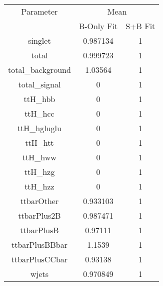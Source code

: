 \begin{table}
\centering

\begin{tabular}{ccc}
\toprule
Parameter 	& \multicolumn{2}{c}{Mean}\\
 	& B-Only Fit & S+B Fit\\
\midrule
singlet 	& \num{0.987134} 	& \num{1}\\
total 	& \num{0.999723} 	& \num{1}\\
total\_background 	& \num{1.03564} 	& \num{1}\\
total\_signal 	& \num{0} 	& \num{1}\\
ttH\_hbb 	& \num{0} 	& \num{1}\\
ttH\_hcc 	& \num{0} 	& \num{1}\\
ttH\_hgluglu 	& \num{0} 	& \num{1}\\
ttH\_htt 	& \num{0} 	& \num{1}\\
ttH\_hww 	& \num{0} 	& \num{1}\\
ttH\_hzg 	& \num{0} 	& \num{1}\\
ttH\_hzz 	& \num{0} 	& \num{1}\\
ttbarOther 	& \num{0.933103} 	& \num{1}\\
ttbarPlus2B 	& \num{0.987471} 	& \num{1}\\
ttbarPlusB 	& \num{0.97111} 	& \num{1}\\
ttbarPlusBBbar 	& \num{1.1539} 	& \num{1}\\
ttbarPlusCCbar 	& \num{0.93138} 	& \num{1}\\
wjets 	& \num{0.970849} 	& \num{1}\\
\bottomrule
\end{tabular}
\end{table}